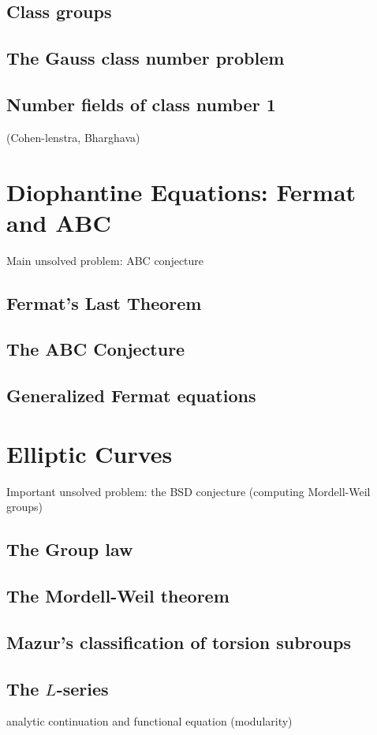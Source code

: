 \documentclass{book}
\theoremstyle{plain}
\theoremstyle{definition}
\numberwithin{equation}{section}
\numberwithin{figure}{section}
\numberwithin{table}{section}
\begin{document}
\section{Class groups}
\section{The Gauss class number problem}
\section{Number fields of class number 1}
 (Cohen-lenstra, Bharghava)



\chapter{Diophantine Equations: Fermat and ABC}
Main unsolved problem: ABC conjecture

\section{Fermat's Last Theorem}
\section{The ABC Conjecture}
\section{Generalized Fermat equations}



\chapter{Elliptic Curves}
Important unsolved problem: the BSD conjecture (computing Mordell-Weil groups)

\section{The Group law}
\section{The Mordell-Weil theorem}
\section{Mazur's classification of torsion subroups}
\section{The $L$-series}
analytic continuation and functional equation (modularity)
\end{document}
